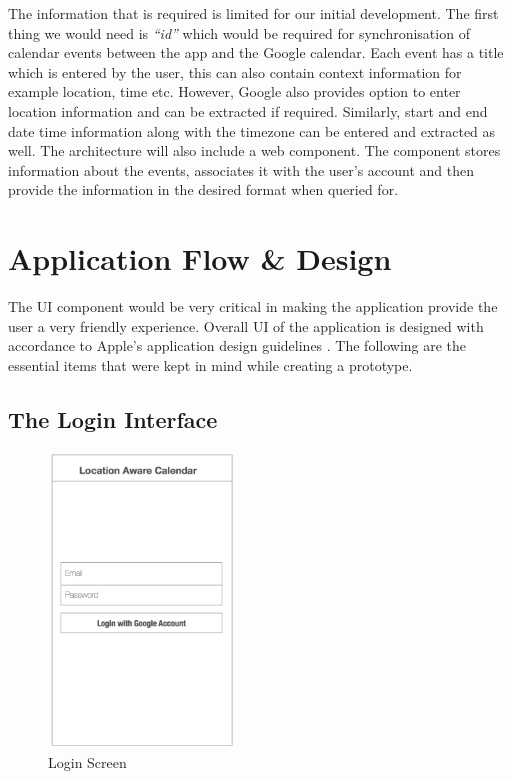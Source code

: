 \documentclass[12pt]{report}
\begin{document}
The information that is required is limited for our initial development. The first thing we would need is \textit{``id''} which would be required for synchronisation of calendar events between the app and the Google calendar. 
Each event has a title which is entered by the user, this can also contain context information for example location, time etc. However, Google also provides option to enter location information and can be extracted if required. Similarly, start and end date time information along with the timezone can be entered and extracted as well. The architecture will also include a web component. The component stores information about the events, associates it with the user's account and then provide the information in the desired format when queried for.

\section{Application Flow \& Design}

The UI component would be very critical in making the application provide the user a very friendly experience. Overall UI of the application is designed with accordance to Apple's application design guidelines \cite{apple2014hci}. The following are the essential items that were kept in mind while creating a prototype.

\subsection{The Login Interface}

\begin{figure}[htbp]
 \centering
 \includegraphics[width=50mm]{LoginScr.png}
   \caption[Login Screen]{Login Screen}
 \label{figure:loginScr}
\end{figure}
\end{document}
